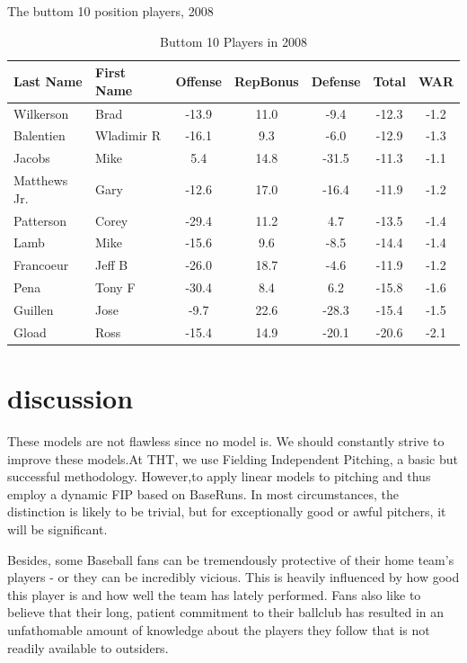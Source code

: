 \documentclass[12pt]{article}
\begin{document}
The buttom 10 position players, 2008
\begin{table}[htbp]
  \caption{Buttom 10 Players in 2008}
  \label{tab:buttom} 
  \centering
  \begin{tabular}{|l|l|c|c|c|c|c|}
     \hline
     \textbf{Last Name} & \textbf{First Name} & \textbf{Offense} & \textbf{RepBonus} & \textbf{Defense} & \textbf{Total} & \textbf{WAR}\\
     \hline
     Wilkerson & Brad & -13.9 & 11.0 & -9.4 & -12.3 & -1.2\\
     Balentien & Wladimir R & -16.1 & 9.3 & -6.0 & -12.9 & -1.3\\
     Jacobs & Mike & 5.4 & 14.8 & -31.5 & -11.3 & -1.1\\
     Matthews Jr. & Gary & -12.6 & 17.0 & -16.4 & -11.9 & -1.2\\
     Patterson & Corey & -29.4 & 11.2 & 4.7 & -13.5 & -1.4\\
     Lamb & Mike & -15.6 & 9.6 & -8.5 & -14.4 & -1.4\\
     Francoeur & Jeff B & -26.0 & 18.7 & -4.6 & -11.9 & -1.2\\
     Pena & Tony F & -30.4 & 8.4 & 6.2 & -15.8 & -1.6\\
     Guillen & Jose & -9.7 & 22.6 & -28.3 & -15.4 & -1.5\\
     Gload & Ross & -15.4 & 14.9 & -20.1 & -20.6 & -2.1\\
    \hline
  \end{tabular}
\end{table}


\section{discussion}
\label{sec:disc}

These models are not flawless since no model is. We should constantly 
strive to improve these models.At THT, we use Fielding Independent Pitching, a basic but successful 
methodology. However,to apply linear models to pitching and thus 
employ a dynamic FIP based on BaseRuns. In most circumstances, the distinction is likely to be trivial, 
but for exceptionally good or awful pitchers, it will be significant.

Besides, some Baseball fans can be tremendously protective of their home team's players 
- or they can be incredibly vicious. This is heavily influenced by how good this player 
is and how well the team has lately performed. Fans also like to believe that their long, 
patient commitment to their ballclub has resulted in an unfathomable amount of knowledge about 
the players they follow that is not readily available to outsiders.
\end{document}
